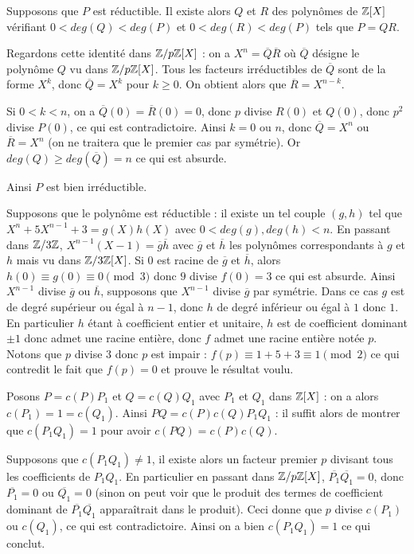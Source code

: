 \begin{sol}
Supposons que $P$ est réductible. Il existe alors $Q$ et $R$ des polynômes de $\mathbb Z[X]$ vérifiant $0<deg(Q)<deg(P)$ et $0<deg(R)<deg(P)$ tels que $P=QR$.

Regardons cette identité dans $\mathbb Z/p\mathbb Z[X]$ : on a $X^n=\overline{Q}\overline{R}$ où $\overline{Q}$ désigne le polynôme $Q$ vu dans $\mathbb Z/p\mathbb Z[X]$. Tous les facteurs irréductibles de $\overline{Q}$ sont de la forme $X^k$, donc $\overline{Q}=X^k$ pour $k\geq 0$. On obtient alors que $\overline{R}=X^{n - k}$.

Si $0<k<n$, on a $\overline{Q}(0)=\overline{R}(0)=0$, donc $p$ divise $R(0)$ et $Q(0)$, donc $p^2$ divise $P(0)$, ce qui est contradictoire. Ainsi $k=0$ ou $n$, donc $\overline{Q}=X^n$ ou $\overline{R}=X^n$ (on ne traitera que le premier cas par symétrie). Or $deg(Q)\geq deg(\overline{Q})=n$ ce qui est absurde.

Ainsi $P$ est bien irréductible.
\end{sol}

\begin{sol}
Supposons que le polynôme est réductible : il existe un tel couple $(g,h)$ tel que $X^{n} + 5X^{n - 1} + 3=g(X)h(X)$ avec $0<deg(g),deg(h)<n$. En passant dans $\mathbb Z/3\mathbb Z$, $X^{n - 1}(X - 1)=\overline{g}\overline{h}$ avec $\overline{g}$ et $\overline{h}$ les polynômes correspondants à $g$ et $h$ mais vu dans $\mathbb Z/3\mathbb Z[X]$. Si $0$ est racine de $\overline{g}$ et $\overline{h}$, alors $h(0)\equiv g(0)\equiv 0\pmod{3}$ donc $9$ divise $f(0)=3$ ce qui est absurde. Ainsi $X^{n - 1}$ divise $\overline{g}$ ou $\overline{h}$, supposons que $X^{n - 1}$ divise $\overline{g}$ par symétrie. Dans ce cas $g$ est de degré supérieur ou égal à $n - 1$, donc $h$ de degré inférieur ou égal à $1$ donc $1$. En particulier $h$ étant à coefficient entier et unitaire, $h$ est de coefficient dominant $\pm 1$ donc admet une racine entière, donc $f$ admet une racine entière notée $p$. Notons que $p$ divise $3$ donc $p$ est impair : $f(p)\equiv 1 + 5 + 3\equiv 1\pmod{2}$ ce qui contredit le fait que $f(p)=0$ et prouve le résultat voulu.
\end{sol}

\begin{sol}
Posons $P=c(P)P_1$ et $Q=c(Q)Q_1$ avec $P_1$ et $Q_1$ dans $\mathbb Z[X]$ : on a alors $c(P_1)=1=c(Q_1)$. Ainsi $PQ=c(P)c(Q) P_1Q_1$ : il suffit alors de montrer que $c(P_1Q_1)=1$ pour avoir $c(PQ)=c(P)c(Q)$.

Supposons que $c(P_1Q_1)\neq 1$, il existe alors un facteur premier $p$ divisant tous les coefficients de $P_1Q_1$. En particulier en passant dans $\mathbb Z/p\mathbb Z[X]$, $\overline{P_1}\overline{Q_1}=0$, donc $\overline{P_1}=0$ ou $\overline{Q_1}=0$ (sinon on peut voir que le produit des termes de coefficient dominant de $\overline{P_1}\overline{Q_1}$ apparaîtrait dans le produit). Ceci donne que $p$ divise $c(P_1)$ ou $c(Q_1)$, ce qui est contradictoire. Ainsi on a bien $c(P_1Q_1)=1$ ce qui conclut.
\end{sol}

